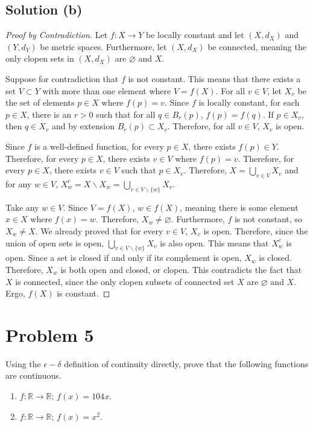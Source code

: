 \documentclass[11pt]{article}
\begin{document}
    \subsection{Solution (b)}
        \begin{proof}[Proof by Contradiction]
            Let $f: X \to Y$ be locally constant and let $(X, d_X)$ and $(Y, d_Y)$ be metric spaces.
            Furthermore, let $(X, d_X)$ be connected, meaning the only clopen sets in $(X, d_X)$ are $\varnothing$ and $X$.
            
            Suppose for contradiction that $f$ is not constant. 
            This means that there exists a set $V \subset Y$ with more than one element where $V = f(X)$.
            For all $v \in V$, let $X_v$ be the set of elements $p \in X$ where $f(p) = v$.
            Since $f$ is locally constant, for each $p \in X$, there is an $r > 0$ such that for all $q \in B_r(p)$, $f(p) = f(q)$.
            If $p \in X_v$, then $q \in X_v$ and by extension $B_r(p) \subset X_v$.
            Therefore, for all $v \in V$, $X_v$ is open.

            Since $f$ is a well-defined function, for every $p \in X$, there exists $f(p) \in Y$.
            Therefore, for every $p \in X$, there exists $v \in V$ where $f(p) = v$.
            Therefore, for every $p \in X$, there exists $v \in V$ such that $p \in X_v$.
            Therefore, $X = \bigcup_{v \in V} X_v$ and for any $w \in V$, $X_w^c = X \backslash X_w = \bigcup_{v \in V \backslash \{w\}} X_v$.

            Take any $w \in V$.
            Since $V = f(X)$, $w \in f(X)$, meaning there is some element $x \in X$ where $f(x) = w$.
            Therefore, $X_w \neq \varnothing$.
            Furthermore, $f$ is not constant, so $X_w \neq X$.
            We already proved that for every $v \in V$, $X_v$ is open.
            Therefore, since the union of open sets is open, $\bigcup_{v \in V \backslash \{w\}} X_v$ is also open.
            This means that $X_w^c$ is open.
            Since a set is closed if and only if its complement is open, $X_w$ is closed.
            Therefore, $X_w$ is both open and closed, or clopen.
            This contradicts the fact that $X$ is connected, since the only clopen subsets of connected set $X$ are $\varnothing$ and $X$.
            Ergo, $f(X)$ is constant.
        \end{proof}

    \pagebreak
\section{Problem 5}
    Using the $\epsilon-\delta$ definition of continuity directly, prove that the following functions are continuous.
    \begin{enumerate}[label=(\alph*)]
        \item 
        $f : \mathbb{R} \to \mathbb{R}$; \quad $f(x) = 104x$.

        \item 
        $f : \mathbb{R} \to \mathbb{R}$; \quad $f(x) = x^2$.
        
    \end{enumerate}
\end{document}
